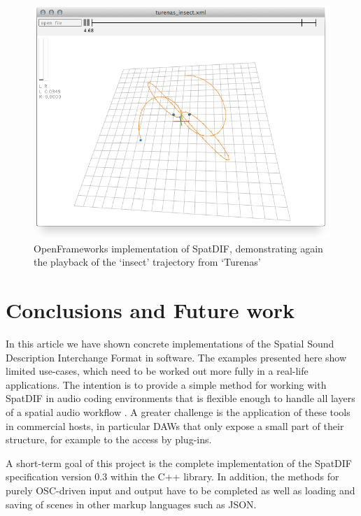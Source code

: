 \documentclass{article}
\begin{document}
\begin{figure}[httb]
	\centering
	\includegraphics[width=\columnwidth]{of_screenshot.png}
	\caption{OpenFrameworks implementation of SpatDIF, demonstrating again the playback of the `insect' trajectory from `Turenas'} 
	\label{fig:screenshot3}
\end{figure}

\section{Conclusions and Future work}\label{sec:conclusions_future_work}


In this article we have shown concrete implementations of the Spatial Sound Description Interchange Format in software.
The examples presented here show limited use-cases, which need to be worked out more fully in a real-life applications.
The intention is to provide a simple method for working with SpatDIF in audio coding environments that is flexible enough to handle all layers of a spatial audio workflow \cite{PetersSMC09}.
A greater challenge is the application of these tools in commercial hosts, in particular DAWs that only expose a small part of their structure, for example to the access by plug-ins.

A short-term goal of this project is the complete implementation of the SpatDIF specification version 0.3 \cite{SpatDIF_03} within the C++ library.
In addition, the methods for purely OSC-driven input and output have to be completed as well as loading and saving of scenes in other markup languages such as JSON.
\end{document}
